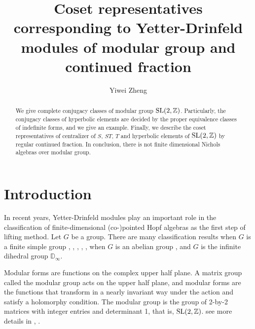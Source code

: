 \documentclass{amsproc}
\theoremstyle{definition}
\theoremstyle{remark}
\numberwithin{equation}{section}
\begin{document}
\title[Coset representatives of  modular group and continued fraction]
{Coset representatives corresponding to Yetter-Drinfeld modules of  modular group and continued fraction}

\author{Yiwei Zheng}
\address{School of Mathematics, Hangzhou Normal University,
Hangzhou 311121, China}









\begin{abstract}
We give complete conjugacy classes of modular group $\rm{SL(2,\mathbb{Z})}$. 
Particularly, the conjugacy classes of hyperbolic elements are 
decided by the proper equivalence classes of indeﬁnite forms, and we give an example.
Finally, we describe the coset representatives of centralizer of $S$, $ST$, $T$ and hyperbolic elements of $\rm{SL(2,\mathbb{Z})}$
by regular continued fraction.
In conclusion, there is not ﬁnite dimensional
Nichols algebras over modular group.

  
\end{abstract}

\maketitle

\section{Introduction}

In recent years, Yetter-Drinfeld modules play an important role 
in the classification of finite-dimensional (co-)pointed Hopf algebras as the first step of lifting method\cite{AS}.
Let $G$ be a group. There are many classiﬁcation results  when $G$ is a finite simple group  \cite{ACG}, 
\cite{ACG16}, \cite{ACG17}, \cite{ACG20}, \cite{ACG21},
when $G$ is an abelian group \cite{AAH}, and $G$ is the infinite dihedral group $\mathbb{D}_\infty$\cite{Z}.


Modular forms are functions on the complex upper half plane. A matrix
group called the modular group acts on the upper half plane, and modular
forms are the functions that transform in a nearly invariant way under the
action and satisfy a holomorphy condition.
The modular group is the group of 2-by-2 matrices with integer entries and
determinant 1, that is, $\rm{SL(2,\mathbb{Z})}$. see more details in \cite{A}, \cite{DS}.
\end{document}
